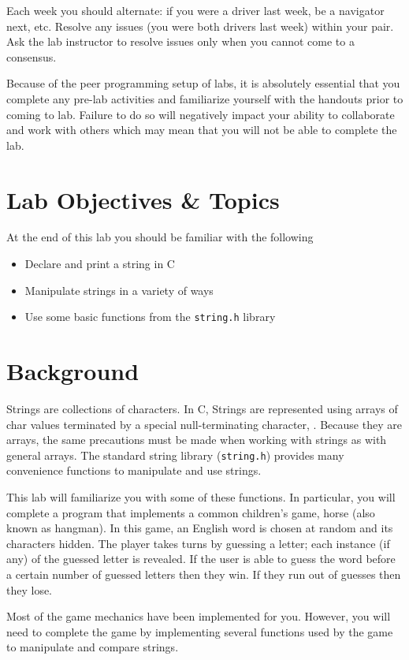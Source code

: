 \documentclass[12pt]{scrartcl}
\begin{document}
Each week you should alternate: if you were a driver last week, 
be a navigator next, etc.  Resolve any issues (you were both drivers
last week) within your pair.  Ask the lab instructor to resolve issues
only when you cannot come to a consensus.  

Because of the peer programming setup of labs, it is absolutely 
essential that you complete any pre-lab activities and familiarize
yourself with the handouts prior to coming to lab.  Failure to do
so will negatively impact your ability to collaborate and work with 
others which may mean that you will not be able to complete the
lab.  

\section{Lab Objectives \& Topics}
At the end of this lab you should be familiar with the following
\begin{itemize}
  \item Declare and print a string in C
  \item Manipulate strings in a variety of ways
  \item Use some basic functions from the \texttt{string.h} library
\end{itemize}

\section{Background}

Strings are collections of characters.  In C, Strings are represented using 
arrays of char values terminated by a special null-terminating character, 
\texttt{\0}.  Because they are arrays, the same precautions must 
be made when working with strings as with general arrays.  The standard 
string library (\texttt{string.h}) provides many convenience 
functions to manipulate and use strings.

This lab will familiarize you with some of these functions.  In particular, 
you will complete a program that implements a common children's game, 
horse (also known as hangman).  In this game, an English word is chosen 
at random and its characters hidden.  The player takes turns by guessing 
a letter; each instance (if any) of the guessed letter is revealed.  If the 
user is able to guess the word before a certain number of guessed letters 
then they win.  If they run out of guesses then they lose.

Most of the game mechanics have been implemented for you.  However, 
you will need to complete the game by implementing several functions 
used by the game to manipulate and compare strings.
\end{document}
